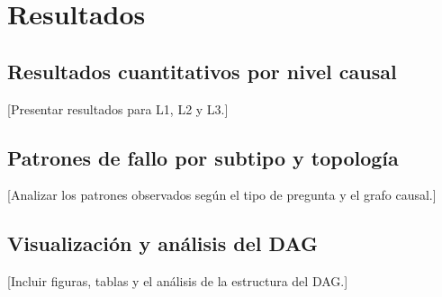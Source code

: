 \chapter{Resultados}

\section{Resultados cuantitativos por nivel causal}
[Presentar resultados para L1, L2 y L3.]

\section{Patrones de fallo por subtipo y topología}
[Analizar los patrones observados según el tipo de pregunta y el grafo causal.]

\section{Visualización y análisis del DAG}
[Incluir figuras, tablas y el análisis de la estructura del DAG.]
